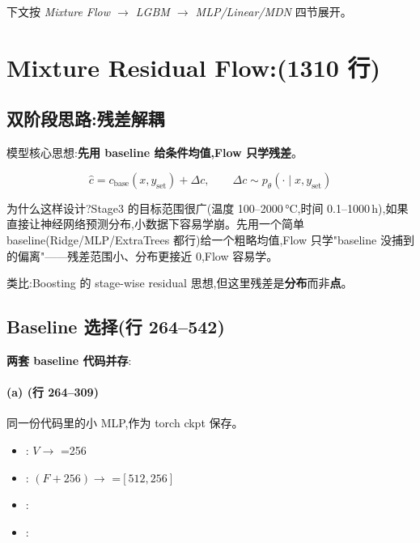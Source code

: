 下文按 \emph{Mixture Flow $\to$ LGBM $\to$ MLP/Linear/MDN} 四节展开。

\section{Mixture Residual Flow:(1310 行)}

\subsection{双阶段思路:残差解耦}

模型核心思想:\textbf{先用 baseline 给条件均值,Flow 只学残差}。

\begin{equation}
\hat c = c_{\text{base}}(x, y_{\text{set}}) + \Delta c, \qquad \Delta c \sim p_\theta(\cdot \mid x, y_{\text{set}})
\end{equation}

为什么这样设计?Stage3 的目标范围很广(温度 100--2000\,°C,时间 0.1--1000\,h),如果直接让神经网络预测分布,小数据下容易学崩。先用一个简单 baseline(Ridge/MLP/ExtraTrees 都行)给一个粗略均值,Flow 只学"baseline 没捕到的偏离"——残差范围小、分布更接近 0,Flow 容易学。

类比:Boosting 的 stage-wise residual 思想,但这里残差是\textbf{分布}而非\textbf{点}。

\subsection{Baseline 选择(行 264--542)}

\textbf{两套 baseline 代码并存}:

\paragraph{(a) (行 264--309)} 同一份代码里的小 MLP,作为 torch ckpt 保存。
\begin{itemize}
    \item {}: $V \to$ =256
    \item {}: $(F + 256) \to$ =$[512, 256]$
    \item {}: 
    \item {}: 
\end{itemize}

